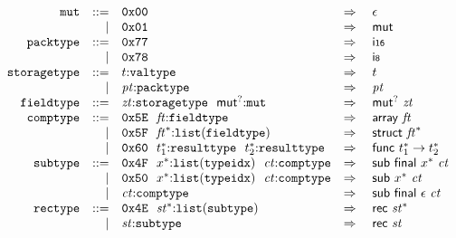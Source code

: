 $$
\begin{array}[t]{@{}lrrl@{}l@{}l@{}l@{}}
& {\mathtt{mut}} & ::= & \mathtt{0x00} & \quad\Rightarrow\quad{} & \epsilon \\
& & | & \mathtt{0x01} & \quad\Rightarrow\quad{} & \mathsf{mut} \\
& {\mathtt{packtype}} & ::= & \mathtt{0x77} & \quad\Rightarrow\quad{} & \mathsf{i{\scriptstyle 16}} \\
& & | & \mathtt{0x78} & \quad\Rightarrow\quad{} & \mathsf{i{\scriptstyle 8}} \\
& {\mathtt{storagetype}} & ::= & t{:}{\mathtt{valtype}} & \quad\Rightarrow\quad{} & t \\
& & | & {\mathit{pt}}{:}{\mathtt{packtype}} & \quad\Rightarrow\quad{} & {\mathit{pt}} \\
& {\mathtt{fieldtype}} & ::= & {\mathit{zt}}{:}{\mathtt{storagetype}}~~{\mathsf{mut}^?}{:}{\mathtt{mut}} & \quad\Rightarrow\quad{} & {\mathsf{mut}^?}~{\mathit{zt}} \\
& {\mathtt{comptype}} & ::= & \mathtt{0x5E}~~{\mathit{ft}}{:}{\mathtt{fieldtype}} & \quad\Rightarrow\quad{} & \mathsf{array}~{\mathit{ft}} \\
& & | & \mathtt{0x5F}~~{{\mathit{ft}}^\ast}{:}{\mathtt{list}}({\mathtt{fieldtype}}) & \quad\Rightarrow\quad{} & \mathsf{struct}~{{\mathit{ft}}^\ast} \\
& & | & \mathtt{0x60}~~{t_1^\ast}{:}{\mathtt{resulttype}}~~{t_2^\ast}{:}{\mathtt{resulttype}} & \quad\Rightarrow\quad{} & \mathsf{func}~{t_1^\ast} \rightarrow {t_2^\ast} \\
& {\mathtt{subtype}} & ::= & \mathtt{0x4F}~~{x^\ast}{:}{\mathtt{list}}({\mathtt{typeidx}})~~{\mathit{ct}}{:}{\mathtt{comptype}} & \quad\Rightarrow\quad{} & \mathsf{sub}~\mathsf{final}~{x^\ast}~{\mathit{ct}} \\
& & | & \mathtt{0x50}~~{x^\ast}{:}{\mathtt{list}}({\mathtt{typeidx}})~~{\mathit{ct}}{:}{\mathtt{comptype}} & \quad\Rightarrow\quad{} & \mathsf{sub}~{x^\ast}~{\mathit{ct}} \\
& & | & {\mathit{ct}}{:}{\mathtt{comptype}} & \quad\Rightarrow\quad{} & \mathsf{sub}~\mathsf{final}~\epsilon~{\mathit{ct}} \\
& {\mathtt{rectype}} & ::= & \mathtt{0x4E}~~{{\mathit{st}}^\ast}{:}{\mathtt{list}}({\mathtt{subtype}}) & \quad\Rightarrow\quad{} & \mathsf{rec}~{{\mathit{st}}^\ast} \\
& & | & {\mathit{st}}{:}{\mathtt{subtype}} & \quad\Rightarrow\quad{} & \mathsf{rec}~{\mathit{st}} \\
\end{array}
$$

